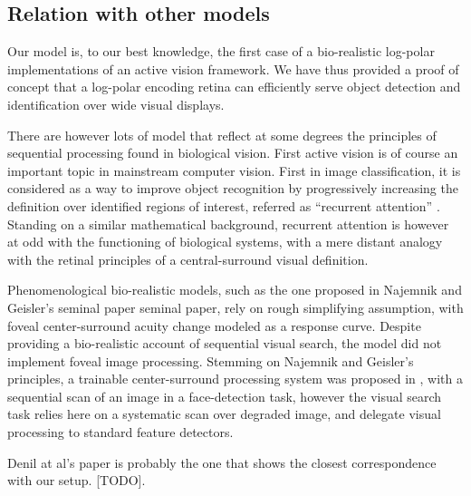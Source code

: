 
\subsection{Relation with other models}

Our model is, to our best knowledge, the first case of a bio-realistic log-polar implementations of an active vision framework. We have thus provided a proof of concept that a log-polar encoding retina can efficiently serve object detection and identification over wide visual displays. 

There are however lots of model that reflect at some degrees the principles of sequential processing found in biological vision. 
First active vision is of course an important topic in mainstream computer vision. First in image classification, it is considered as a way to improve object recognition by progressively increasing the definition over identified regions of interest, referred as ``recurrent attention'' \citep{mnih2014recurrent,fu2017look}. Standing on a similar mathematical background, recurrent attention is however at odd with the functioning of biological systems, with a mere distant analogy with the retinal principles of a central-surround visual definition. 

Phenomenological bio-realistic models, such as the one proposed in Najemnik and Geisler's seminal paper \citep{Najemnik05} seminal paper, rely on rough simplifying assumption, with foveal center-surround acuity change modeled as a response curve. Despite providing a bio-realistic account of sequential visual search, the model did not  implement foveal image processing. Stemming on Najemnik and Geisler's principles, a trainable center-surround processing system was proposed in \cite{Butko2010infomax}, with a sequential scan of an image in a face-detection task, however the visual search task relies here on a systematic scan over degraded image, and delegate visual processing to standard feature detectors.  

Denil at al's paper \citep{denil2012learning} is probably the one that shows the closest correspondence with our setup. {\color{magenta} [TODO]}.